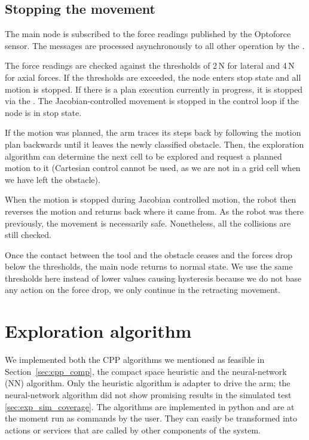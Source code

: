 \documentclass[buriama8_dp.tex]{subfiles}
\begin{document}
\subsection{Stopping the movement}
\label{subsec:impl_stop}

The main node is subscribed to the force readings published by the Optoforce sensor. The messages are processed asynchronously to all other operation by the .

The force readings are checked against the thresholds of 2\,N for lateral and 4\,N for axial forces. If the thresholds are exceeded, the node enters stop state and all motion is stopped. If there is a plan execution currently in progress, it is stopped via the . The Jacobian-controlled movement is stopped in the control loop if the node is in stop state.

If the motion was planned, the arm traces its steps back by following the motion plan backwards until it leaves the newly classified obstacle.  Then, the exploration algorithm can determine the next cell to be explored and request a planned motion to it (Cartesian control cannot be used, as we are not in a grid cell when we have left the obstacle).

When the motion is stopped during Jacobian controlled motion, the robot then reverses the motion and returns back where it came from. As the robot was there previously, the movement is necessarily safe. Nonetheless, all the collisions are still checked.

Once the contact between the tool and the obstacle ceases and the forces drop below the thresholds, the main node returns to normal state. We use the same thresholds here instead of lower values causing hysteresis because we do not base any action on the force drop, we only continue in the retracting movement.


\section{Exploration algorithm}
\label{sec:alg_impl}

We implemented both the CPP algorithms we mentioned as feasible in Section~\ref{sec:cpp_comp}, the compact space heuristic and the neural-network (NN) algorithm. Only the heuristic algorithm is adapter to drive the arm; the neural-network algorithm did not show promising results in the simulated test \ref{sec:exp_sim_coverage}. The algorithms are implemented in python and are at the moment run as commands by the user. They can easily be transformed into actions or services that are called by other components of the system.
\end{document}
